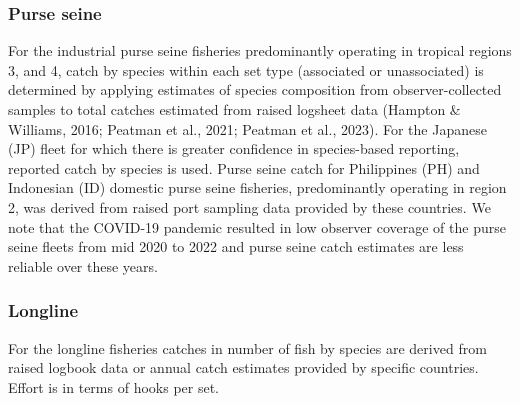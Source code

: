 \documentclass[
  english,
  a4paper,
  a4paper,
  11pt]{SCreport}
\begin{document}
\subsubsection{Purse seine}\label{sec-catch-effort-PS}

For the industrial purse seine fisheries predominantly operating in
tropical regions 3, and 4, catch by species within each set type
(associated or unassociated) is determined by applying estimates of
species composition from observer-collected samples to total catches
estimated from raised logsheet data (Hampton \& Williams, 2016; Peatman
et al., 2021; Peatman et al., 2023). For the Japanese (JP) fleet for
which there is greater confidence in species-based reporting, reported
catch by species is used. Purse seine catch for Philippines (PH) and
Indonesian (ID) domestic purse seine fisheries, predominantly operating
in region 2, was derived from raised port sampling data provided by
these countries. We note that the COVID-19 pandemic resulted in low
observer coverage of the purse seine fleets from mid 2020 to 2022 and
purse seine catch estimates are less reliable over these years.

\subsubsection{Longline}\label{sec-catch-effort-LL}

For the longline fisheries catches in number of fish by species are
derived from raised logbook data or annual catch estimates provided by
specific countries. Effort is in terms of hooks per set.
\end{document}
